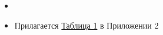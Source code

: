 \begin{itemize}
    \item {}

    \item Прилагается \hyperlink{table1}{Таблица 1} в Приложении 2
\end{itemize}